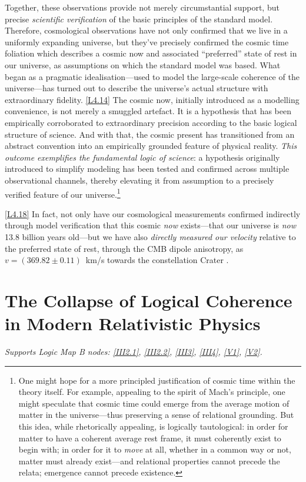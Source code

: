 \documentclass[12pt]{book}
\newcounter{logicanchor}
\newenvironment{logicanchorenv}[1]{\refstepcounter{logicanchor}\label{#1}}{}
\newcommand{\logiclink}[2]{\begin{logicanchorenv}{logic:#1}\end{logicanchorenv}\hyperref[appendix:#1]{[#1]}\xspace}
\begin{document}
Together, these observations provide not merely circumstantial support, but precise \textit{scientific verification} of the basic principles of the standard model. Therefore, cosmological observations have not only confirmed that we live in a uniformly expanding universe, but they've precisely confirmed the cosmic time foliation which describes a cosmic now and associated ``preferred'' state of rest in our universe, as assumptions on which the standard model was based. What began as a pragmatic idealisation---used to model the large-scale coherence of the universe---has turned out to describe the universe's actual structure with extraordinary fidelity. \logiclink{L4.14}{} The cosmic now, initially introduced as a modelling convenience, is not merely a smuggled artefact. It is a hypothesis that has been empirically corroborated to extraordinary precision according to the basic logical structure of science. And with that, the cosmic present has transitioned from an abstract convention into an empirically grounded feature of physical reality. \textit{This outcome exemplifies the fundamental logic of science}: a hypothesis originally introduced to simplify modeling has been tested and confirmed across multiple observational channels, thereby elevating it from assumption to a precisely verified feature of our universe.\footnote{One might hope for a more principled justification of cosmic time within the theory itself. For example, appealing to the spirit of Mach's principle, one might speculate that cosmic time could emerge from the average motion of matter in the universe---thus preserving a sense of relational grounding. But this idea, while rhetorically appealing, is logically tautological: in order for matter to have a coherent average rest frame, it must coherently exist to begin with; in order for it to \textit{move} at all, whether in a common way or not, matter must already exist---and relational properties cannot precede the relata; emergence cannot precede existence.}

\logiclink{L4.18}{} In fact, not only have our cosmological measurements confirmed indirectly through model verification that this cosmic \textit{now} exists---that our universe is \textit{now} 13.8 billion years old---but we have also \textit{directly measured our velocity} relative to the preferred state of rest, through the CMB dipole anisotropy, as $v=(369.82\pm0.11)$~km/s towards the constellation Crater \cite{Aghanim2020a}.

\section[The Collapse of Logical Coherence in Relativity]{The Collapse of Logical Coherence in Modern Relativistic Physics}\label{sec:4.4}
\noindent\textit{Supports Logic Map B nodes: \hyperref[appendix:III2.1]{[III2.1]}, \hyperref[appendix:III2.2]{[III2.2]}, \hyperref[appendix:III3]{[III3]}, \hyperref[appendix:III4]{[III4]}, \hyperref[appendix:V1]{[V1]}, \hyperref[appendix:V2]{[V2]}.}
\end{document}
